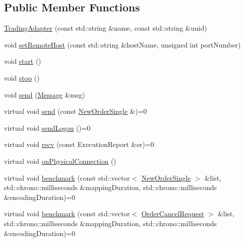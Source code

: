 \subsection*{Public Member Functions}
\begin{DoxyCompactItemize}
\item 
\hyperlink{classMetal_1_1TradingAdapter_a472ad74753a0bd77a3e78c1f7f8d0398}{Trading\+Adapter} (const std\+::string \&name, const std\+::string \&uuid)
\item 
void \hyperlink{classMetal_1_1TradingAdapter_ae0b309ccc7e9ec5dfe262d071dde4c17}{set\+Remote\+Host} (const std\+::string \&host\+Name, unsigned int port\+Number)
\item 
void \hyperlink{classMetal_1_1TradingAdapter_a1ba0cd89d6475faf9da358140660e886}{start} ()
\item 
void \hyperlink{classMetal_1_1TradingAdapter_aa5e283e9e0a339c738cfba37fed3c7ff}{stop} ()
\item 
void \hyperlink{classMetal_1_1TradingAdapter_ac99cc99c695715fc396756441e68abc0}{send} (\hyperlink{classMetal_1_1Message}{Message} \&msg)
\item 
virtual void \hyperlink{classMetal_1_1TradingAdapter_a2ecc8f1c8fe8a8d29625d142f473f1c3}{send} (const \hyperlink{classMetal_1_1NewOrderSingle}{New\+Order\+Single} \&)=0
\item 
virtual void \hyperlink{classMetal_1_1TradingAdapter_a39562015df3e7202a5e8f932b8bde43e}{send\+Logon} ()=0
\item 
virtual void \hyperlink{classMetal_1_1TradingAdapter_af0015d51815dedb1bc78258b3030d751}{recv} (const Execution\+Report \&er)=0
\item 
virtual void \hyperlink{classMetal_1_1TradingAdapter_a10208ab030e4b3a9db4dc71206a1812e}{on\+Physical\+Connection} ()
\item 
virtual void \hyperlink{classMetal_1_1TradingAdapter_a161ad3db17091807d091d1b236de0105}{benchmark} (const std\+::vector$<$ \hyperlink{classMetal_1_1NewOrderSingle}{New\+Order\+Single} $>$ \&list, std\+::chrono\+::milliseconds \&mapping\+Duration, std\+::chrono\+::milliseconds \&encoding\+Duration)=0
\item 
virtual void \hyperlink{classMetal_1_1TradingAdapter_ae0513f6865414f61a41a8f62bafb0187}{benchmark} (const std\+::vector$<$ \hyperlink{classMetal_1_1OrderCancelRequest}{Order\+Cancel\+Request} $>$ \&list, std\+::chrono\+::milliseconds \&mapping\+Duration, std\+::chrono\+::milliseconds \&encoding\+Duration)=0
\end{DoxyCompactItemize}
